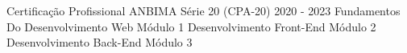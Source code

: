 \begin{cvhonors}
  \cvhonor
    {Certificação Profissional ANBIMA Série 20}
    {(CPA-20)}
    {2020 - 2023}
    {}
  \cvhonor
    {Fundamentos Do Desenvolvimento Web}
    {Módulo 1}
    {}
    {}
  \cvhonor
    {Desenvolvimento Front-End}
    {Módulo 2}
    {}
    {}
  \cvhonor
    {Desenvolvimento Back-End}
    {Módulo 3}
    {}
    {}
   
\end{cvhonors}

\vspace{.5cm}